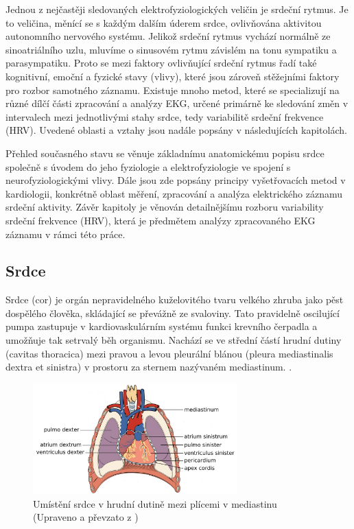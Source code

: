 Jednou z nejčastěji sledovaných elektrofyziologických veličin je srdeční rytmus.
Je to veličina, měnící se s každým dalším úderem srdce, ovlivňována aktivitou
autonomního nervového systému. Jelikož srdeční rytmus vychází normálně ze
sinoatriálního uzlu, mluvíme o sinusovém rytmu závislém na tonu sympatiku a
parasympatiku. Proto se mezi faktory ovlivňující srdeční rytmus řadí také
kognitivní, emoční a fyzické stavy (vlivy), které jsou zároveň stěžejními
faktory pro rozbor samotného záznamu. Existuje mnoho metod, které se
specializují na různé dílčí části zpracování a analýzy EKG, určené primárně ke
sledování změn v intervalech mezi jednotlivými stahy srdce, tedy variabilitě
srdeční frekvence (HRV). Uvedené oblasti a vztahy jsou nadále popsány v
následujících kapitolách.

Přehled současného stavu se věnuje základnímu anatomickému popisu srdce společně
s úvodem do jeho fyziologie a elektrofyziologie ve spojení s neurofyziologickými
vlivy. Dále jsou zde popsány principy vyšetřovacích metod v kardiologii,
konkrétně oblast měření, zpracování a analýza elektrického záznamu srdeční
aktivity. Závěr kapitoly je věnován detailnějšímu rozboru variability srdeční
frekvence (HRV), která je předmětem analýzy zpracovaného EKG záznamu v rámci
této práce.

\subsection{Srdce}
\label{section:heart}
Srdce (cor) je orgán nepravidelného kuželovitého tvaru velkého zhruba jako pěst
dospělého člověka, skládající se převážně ze svaloviny. Tato pravidelně
oscilující pumpa zastupuje v kardiovaskulárním systému funkci krevního čerpadla
a umožňuje tak setrvalý běh organismu. Nachází se ve střední částí hrudní dutiny
(cavitas thoracica) mezi pravou a levou pleurální blánou (pleura mediastinalis
dextra et sinistra) v prostoru za sternem nazývaném mediastinum.
\cite{Memorix2017,Weinhaus2005}.

\begin{figure}[h]
	\begin{center}
		\includegraphics[width=0.7\textwidth]{../assets/anatomy/mediastinum}
		\caption{Umístění srdce v hrudní dutině mezi plícemi v mediastinu
			(Upraveno a převzato z \cite{OpenStax})}
		\label{img:mediastinum}
	\end{center}
\end{figure}

